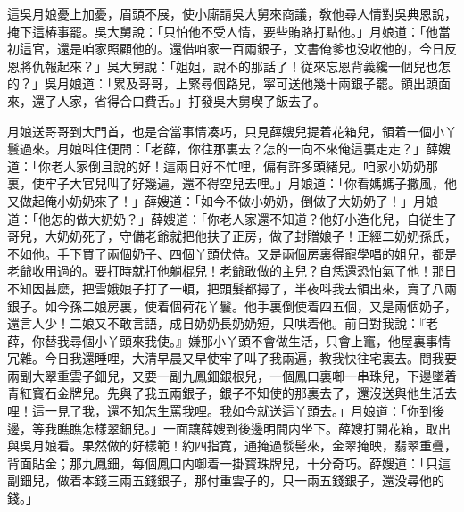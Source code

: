 這吳月娘憂上加憂，眉頭不展，使小廝請吳大舅來商議，敎他尋人情對吳典恩說，掩下這樁事罷。吳大舅說：「只怕他不受人情，要些賄賂打點他。」月娘道：「他當初這官，還是咱家照顧他的。還借咱家一百兩銀子，文書俺爹也没收他的，今日反恩將仇報起來？」吳大舅說：「姐姐，說不的那話了！従來忘恩背義纔一個兒也怎的？」吳月娘道：「累及哥哥，上緊尋個路兒，寜可送他幾十兩銀子罷。領出頭面來，還了人家，省得合口費舌。」打發吳大舅喫了飯去了。

月娘送哥哥到大門首，也是合當事情凑巧，只見薛嫂兒提着花箱兒，領着一個小丫鬟過來。月娘呌住便問：「老薛，你往那裏去？怎的一向不來俺這裏走走？」薛嫂道：「你老人家倒且說的好！這兩日好不忙哩，偏有許多頭緒兒。咱家小奶奶那裏，使牢子大官兒叫了好幾遍，還不得空兒去哩。」月娘道：「你看媽媽子撒風，他又做起俺小奶奶來了！」薛嫂道：「如今不做小奶奶，倒做了大奶奶了！」月娘道：「他怎的做大奶奶？」薛嫂道：「你老人家還不知道？他好小造化兒，自従生了哥兒，大奶奶死了，守備老爺就把他扶了正房，做了封贈娘子！正經二奶奶孫氏，不如他。手下買了兩個奶子、四個丫頭伏侍。又是兩個房裏得寵學唱的姐兒，都是老爺收用過的。要打時就打他躺棍兒！老爺敢做的主兒？自恁還恐怕氣了他！那日不知因甚麽，把雪娥娘子打了一頓，把頭髮都撏了，半夜呌我去領出來，賣了八兩銀子。如今孫二娘房裏，使着個荷花丫鬟。他手裏倒使着四五個，又是兩個奶子，還言人少！二娘又不敢言語，成日奶奶長奶奶短，只哄着他。前日對我說：『老薛，你替我尋個小丫頭來我使。』嫌那小丫頭不會做生活，只會上竃，他屋裏事情冗雜。今日我還睡哩，大清早晨又早使牢子叫了我兩遍，教我快往宅裏去。問我要兩副大翠重雲子鈿兒，又要一副九鳳鈿銀根兒，一個鳳口裏啣一串珠兒，下邊墜着青紅寳石金牌兒。先與了我五兩銀子，銀子不知使的那裏去了，還沒送與他生活去哩！這一見了我，還不知怎生罵我哩。我如今就送這丫頭去。」月娘道：「你到後邊，等我瞧瞧怎樣翠鈿兒。」一面讓薛嫂到後邊明間内坐下。薛嫂打開花箱，取出與吳月娘看。果然做的好樣範！約四指寬，通掩過䯼髻來，金翠掩映，翡翠重疊，背面貼金；那九鳳鈿，每個鳳口内啣着一掛寳珠牌兒，十分奇巧。薛嫂道：「只這副鈿兒，做着本錢三兩五錢銀子，那付重雲子的，只一兩五錢銀子，還没尋他的錢。」

